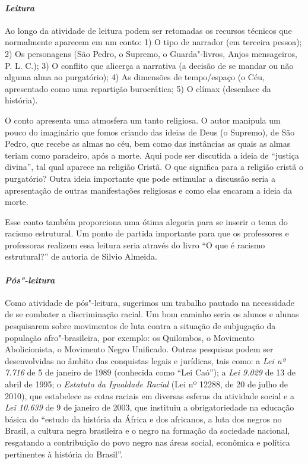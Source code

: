 \documentclass[11pt]{extarticle}
\begin{document}
\paragraph{\textit{Leitura}}

Ao longo da atividade de leitura podem ser retomadas os recursos
técnicos que normalmente aparecem em um conto: 1) O tipo de narrador (em
terceira pessoa); 2) Os personagens (São Pedro, o Supremo, o Guarda"-livros,
Anjos mensageiros, P. L. C.); 3) O conflito que alicerça a narrativa (a
decisão de se mandar ou não alguma alma ao purgatório); 4) As dimensões
de tempo/espaço (o Céu, apresentado como uma repartição burocrática; 5)
O clímax (desenlace da história).

O conto apresenta uma atmosfera um tanto religiosa. O autor manipula um
pouco do imaginário que fomos criando das ideias de Deus (o Supremo), de
São Pedro, que recebe as almas no céu, bem como das instâncias as quais
as almas teriam como paradeiro, após a morte. Aqui pode ser discutida a
ideia de ``justiça divina'', tal qual aparece na religião Cristã. O que
significa para a religião cristã o purgatório? Outra ideia importante
que pode estimular a discussão seria a apresentação de outras
manifestações religiosas e como elas encaram a ideia da morte.






Esse conto também proporciona uma ótima alegoria para se inserir o tema
do racismo estrutural. Um ponto de partida importante para que os
professores e professoras realizem essa leitura seria através do livro
``O que é racismo estrutural?'' de autoria de Silvio Almeida.

\paragraph{\textit{Pós"-leitura}}

Como atividade de pós"-leitura, sugerimos um trabalho pautado na
necessidade de se combater a discriminação racial. Um bom caminho seria
os alunos e alunas pesquisarem sobre movimentos de luta contra a
situação de subjugação da população afro"-brasileira, por exemplo: os
Quilombos, o Movimento Abolicionista, o Movimento Negro Unificado.
Outras pesquisas podem ser desenvolvidas no âmbito das conquistas legais
e jurídicas, tais como: a \textit{Lei nº 7.716} de 5 de janeiro de 1989
(conhecida como ``Lei Caó''); a \textit{Lei 9.029} de 13 de abril de
1995; o \textit{Estatuto da Igualdade Racial} (Lei nº 12288, de 20 de
julho de 2010), que estabelece as cotas raciais em diversas esferas da
atividade social e a \textit{Lei 10.639} de 9 de janeiro de 2003, que
instituiu a obrigatoriedade na educação básica do ``estudo da história
da África e dos africanos, a luta dos negros no Brasil, a cultura negra
brasileira e o negro na formação da sociedade nacional, resgatando a
contribuição do povo negro nas áreas social, econômica e política
pertinentes à história do Brasil''.
\end{document}

